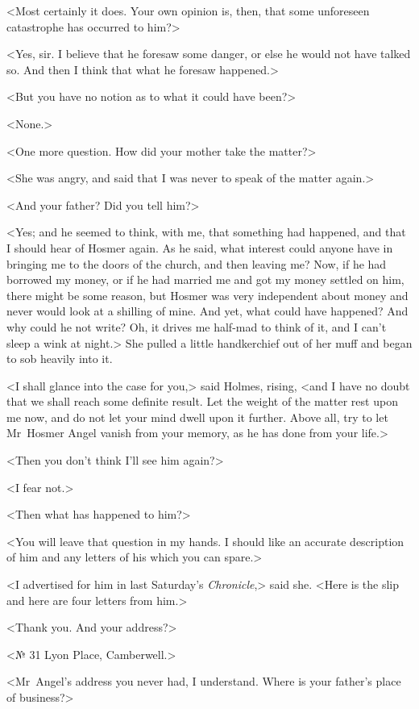 <Most certainly it does. Your own opinion is, then, that some unforeseen catastrophe has occurred to him?>

<Yes, sir. I believe that he foresaw some danger, or else he would not have talked so. And then I think that what he foresaw happened.>

<But you have no notion as to what it could have been?>

<None.>

<One more question. How did your mother take the matter?>

<She was angry, and said that I was never to speak of the matter again.>

<And your father? Did you tell him?>

<Yes; and he seemed to think, with me, that something had happened, and that I should hear of Hosmer again. As he said, what interest could anyone have in bringing me to the doors of the church, and then leaving me? Now, if he had borrowed my money, or if he had married me and got my money settled on him, there might be some reason, but Hosmer was very independent about money and never would look at a shilling of mine. And yet, what could have happened? And why could he not write? Oh, it drives me half-mad to think of it, and I can't sleep a wink at night.> She pulled a little handkerchief out of her muff and began to sob heavily into it.

<I shall glance into the case for you,> said Holmes, rising, <and I have no doubt that we shall reach some definite result. Let the weight of the matter rest upon me now, and do not let your mind dwell upon it further. Above all, try to let Mr~Hosmer Angel vanish from your memory, as he has done from your life.>

<Then you don't think I'll see him again?>

<I fear not.>

<Then what has happened to him?>

<You will leave that question in my hands. I should like an accurate description of him and any letters of his which you can spare.>

<I advertised for him in last Saturday's \textit{Chronicle},> said she. <Here is the slip and here are four letters from him.>

<Thank you. And your address?>

<№ 31 Lyon Place, Camberwell.>

<Mr~Angel's address you never had, I understand. Where is your father's place of business?>

